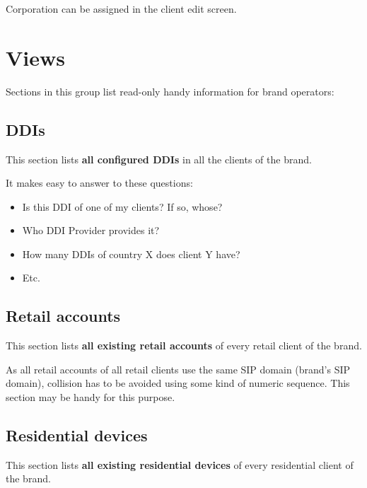 \documentclass[letterpaper,10pt,english]{sphinxmanual}
\begin{document}
Corporation can be assigned in the client edit screen.


\section{Views}
\label{administration_portal/brand/views/index::doc}\label{administration_portal/brand/views/index:views}
Sections in this group list read-only handy information for brand operators:


\subsection{DDIs}
\label{administration_portal/brand/views/ddis:ddis}\label{administration_portal/brand/views/ddis::doc}\label{administration_portal/brand/views/ddis:id1}
This section lists \textbf{all configured DDIs} in all the clients of the brand.

It makes easy to answer to these questions:
\begin{itemize}
\item {} 
Is this DDI of one of my clients? If so, whose?

\item {} 
Who DDI Provider provides it?

\item {} 
How many DDIs of country X does client Y have?

\item {} 
Etc.

\end{itemize}


\subsection{Retail accounts}
\label{administration_portal/brand/views/retail_accounts::doc}\label{administration_portal/brand/views/retail_accounts:retail-accounts}
This section lists \textbf{all existing retail accounts} of every retail client of the brand.

As all retail accounts of all retail clients use the same SIP domain (brand's SIP domain), collision has to be
avoided using some kind of numeric sequence. This section may be handy for this purpose.


\subsection{Residential devices}
\label{administration_portal/brand/views/residential_devices::doc}\label{administration_portal/brand/views/residential_devices:residential-devices}
This section lists \textbf{all existing residential devices} of every residential client of the brand.
\end{document}
